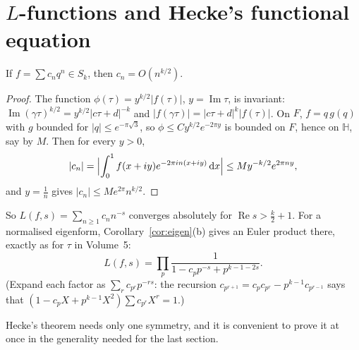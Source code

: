 \section{$L$-functions and Hecke's functional equation}

\begin{proposition}\label{prop:heckebound}
If $f=\sum c_nq^n\in S_k$, then $c_n=O(n^{k/2})$.
\end{proposition}
\begin{proof}
The function $\phi(\tau)=y^{k/2}|f(\tau)|$, $y=\operatorname{Im}\tau$, is invariant: $\operatorname{Im}(\gamma\tau)^{k/2}=y^{k/2}|c\tau+d|^{-k}$ and
$|f(\gamma\tau)|=|c\tau+d|^k|f(\tau)|$. On $F$, $f=q\,g(q)$ with $g$ bounded for $|q|\le e^{-\pi\sqrt3}$, so $\phi\le Cy^{k/2}e^{-2\pi y}$ is bounded on $F$, hence on $\mathbb H$,
say by $M$. Then for every $y>0$,
\[
|c_n|=\Bigl|\int_0^1f(x+iy)e^{-2\pi in(x+iy)}\,\mathrm dx\Bigr|\le My^{-k/2}e^{2\pi ny},
\]
and $y=\frac1n$ gives $|c_n|\le Me^{2\pi}n^{k/2}$.
\end{proof}

So $L(f,s)=\sum_{n\ge1}c_nn^{-s}$ converges absolutely for $\operatorname{Re}s>\frac k2+1$. For a normalised eigenform, Corollary~\ref{cor:eigen}(b) gives an Euler product
there, exactly as for $\tau$ in Volume~5:
\[
L(f,s)=\prod_p\frac1{1-c_pp^{-s}+p^{k-1-2s}}.
\]
(Expand each factor as $\sum_rc_{p^r}p^{-rs}$: the recursion $c_{p^{r+1}}=c_pc_{p^r}-p^{k-1}c_{p^{r-1}}$ says that $(1-c_pX+p^{k-1}X^2)\sum c_{p^r}X^r=1$.)

Hecke's theorem needs only one symmetry, and it is convenient to prove it at once in the generality needed for the last section.

